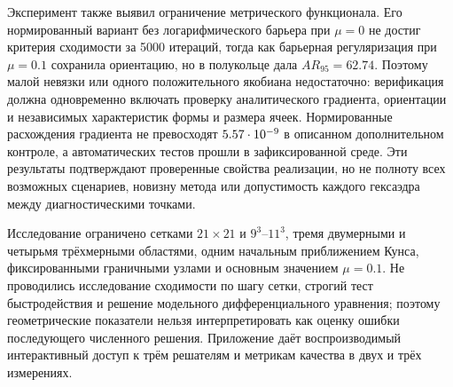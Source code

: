 \documentclass[11pt,a4paper]{article}
\begin{document}
Эксперимент также выявил ограничение метрического функционала. Его
нормированный вариант без логарифмического барьера при \(\mu=0\) не
достиг критерия сходимости за 5000 итераций, тогда как барьерная
регуляризация при \(\mu=0.1\) сохранила ориентацию, но в полукольце
дала \(AR_{95}=62.74\). Поэтому малой
невязки или одного положительного якобиана недостаточно: верификация
должна одновременно включать проверку аналитического градиента,
ориентации и независимых характеристик формы и размера ячеек.
Нормированные расхождения градиента не превосходят
$5.57\cdot10^{-9}$ в описанном дополнительном контроле, а
\AuditTestCount{} автоматических тестов прошли в зафиксированной среде.
Эти результаты подтверждают проверенные свойства реализации, но не
полноту всех возможных сценариев, новизну метода или допустимость
каждого гексаэдра между диагностическими точками.

Исследование ограничено сетками \(21\times21\) и \(9^3\)--\(11^3\),
тремя двумерными и четырьмя трёхмерными областями, одним
начальным приближением Кунса, фиксированными граничными узлами и
основным значением \(\mu=0.1\). Не проводились исследование сходимости
по шагу сетки, строгий тест быстродействия и решение модельного
дифференциального уравнения; поэтому геометрические показатели нельзя
интерпретировать как оценку ошибки последующего численного решения.
Приложение даёт воспроизводимый интерактивный доступ к трём решателям
и метрикам качества в двух и трёх измерениях.
\end{document}
